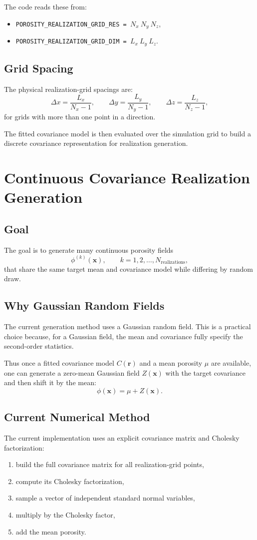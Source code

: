 \documentclass[11pt]{article}
\begin{document}
The code reads these from:
\begin{itemize}
\item \texttt{POROSITY\_REALIZATION\_GRID\_RES = \(N_x\ N_y\ N_z\)},
\item \texttt{POROSITY\_REALIZATION\_GRID\_DIM = \(L_x\ L_y\ L_z\)}.
\end{itemize}

\subsection{Grid Spacing}
The physical realization-grid spacings are:
\[
\Delta x = \frac{L_x}{N_x-1},
\qquad
\Delta y = \frac{L_y}{N_y-1},
\qquad
\Delta z = \frac{L_z}{N_z-1},
\]
for grids with more than one point in a direction.

The fitted covariance model is then evaluated over the simulation grid to build a
discrete covariance representation for realization generation.

\section{Continuous Covariance Realization Generation}
\subsection{Goal}
The goal is to generate many continuous porosity fields
\[
\phi^{(k)}(\bm{x}), \qquad k=1,2,\dots,N_{\mathrm{realizations}},
\]
that share the same target mean and covariance model while differing by random
draw.

\subsection{Why Gaussian Random Fields}
The current generation method uses a Gaussian random field. This is a practical
choice because, for a Gaussian field, the mean and covariance fully specify the
second-order statistics.

Thus once a fitted covariance model \(C(\bm{r})\) and a mean porosity \(\mu\)
are available, one can generate a zero-mean Gaussian field \(Z(\bm{x})\) with
the target covariance and then shift it by the mean:
\[
\phi(\bm{x}) = \mu + Z(\bm{x}).
\]

\subsection{Current Numerical Method}
The current implementation uses an explicit covariance matrix and Cholesky
factorization:
\begin{enumerate}[label=\arabic*.]
\item build the full covariance matrix for all realization-grid points,
\item compute its Cholesky factorization,
\item sample a vector of independent standard normal variables,
\item multiply by the Cholesky factor,
\item add the mean porosity.
\end{enumerate}
\end{document}
